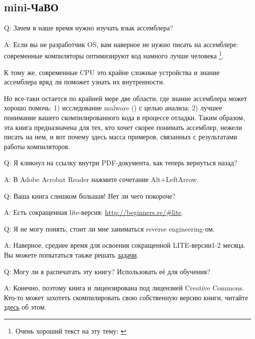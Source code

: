 \newcommand{\HACKINGMdURL}{https://github.com/dennis714/RE-for-beginners/blob/master/HACKING.md}
\newcommand{\FNURLREDDIT}{\footnote{\href{http://go.yurichev.com/17027}{reddit.com/r/ReverseEngineering/}}}
\newcommand{\LITEURL}{\url{http://beginners.re/\#lite}}

\ifdefined\RUSSIAN
\subsection*{mini-ЧаВО}

\par Q: Зачем в наше время нужно изучать язык ассемблера?
\par A: Если вы не разработчик \ac{OS}, вам наверное не нужно писать на ассемблере: современные компиляторы оптимизируют код намного лучше человека
\footnote{Очень хороший текст на эту тему: \cite{AgnerFog}}.

К тому же, современные \ac{CPU} это крайне сложные устройства и знание ассемблера вряд ли
поможет узнать их внутренности.

Но все-таки остается по крайней мере две области, где знание ассемблера может хорошо помочь:
1) исследование malware () с целью анализа; 2) лучшее понимание
вашего скомпилированного кода в процессе отладки.
Таким образом, эта книга предназначена для тех, кто хочет скорее понимать ассемблер,
нежели писать на нем, и вот почему здесь масса примеров, связанных с результатами
работы компиляторов.

\par Q: Я кликнул на ссылку внутри PDF-документа, как теперь вернуться назад?
\par A: В Adobe Acrobat Reader нажмите сочетание Alt+LeftArrow.

\ifx\LITE\undefined
\par Q: Ваша книга слишком большая! Нет ли чего покороче?
\par A: Есть сокращенная lite-версия: \LITEURL{}.
\fi

\par Q: Я не могу понять, стоит ли мне заниматься reverse engineering-ом.
\par A: Наверное, среднее время для освоения сокращенной LITE-версии\EMDASH{}1-2 месяца. Вы можете попытаться также решать \href{http://challenges.re/}{задачи}.

\par Q: Могу ли я распечатать эту книгу? Использовать её для обучения?
\par A: Конечно, поэтому книга и лицензирована под лицензией Creative Commons. Кто-то может захотеть скомпилировать свою собственную версию книги, читайте \href{\HACKINGMdURL}{здесь} об этом.

